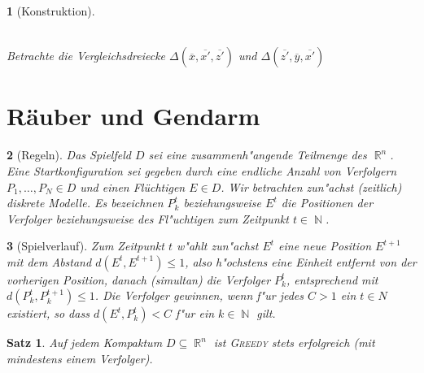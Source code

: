 \documentclass[paper=A4, twoside, chapterprefix=true, bibliography=totoc, headsepline]{scrbook}
\DeclareMathOperator{\N}{\mathbb{N}}
\DeclareMathOperator{\R}{\mathbb{R}}
\newcommand{\kapit}[1]{\textsc{#1}\xspace} %
\newcommand{\Greedy}{\kapit{Greedy}}
\theoremstyle{break}
\theoremstyle{nonumberbreak}
\newtheorem{satz}{Satz}
\theoremstyle{emptybreak}
\newtheorem{emptythm}{}%
\theoremstyle{break}
\newcommand{\quot}[1]{\textrm{\glqq}{#1}\textrm{\grqq}}
\begin{document}
\begin{emptythm}[Konstruktion]
\begin{center}
\\
Betrachte die Vergleichsdreiecke $\Delta(\overline x, \overline{x'}, \overline{z'})$ und $\Delta(\overline{z'}, \overline{y}, \overline{x'})$
\end{center}
\end{emptythm}

\section{R\"auber und Gendarm}

\begin{emptythm}[Regeln]
Das Spielfeld $D$ sei eine zusammenh"angende Teilmenge des $\R^n$.
Eine Startkonfiguration sei gegeben durch eine endliche Anzahl von Verfolgern $P_1, \ldots, P_N \in D$ und einen Flüchtigen $E \in D$.
Wir betrachten zun"achst (zeitlich) diskrete Modelle.
Es bezeichnen $P_k^t$ beziehungsweise $E^t$ die Positionen der Verfolger beziehungsweise des Fl"uchtigen zum Zeitpunkt $t \in \N$.
\end{emptythm}

\begin{emptythm}[Spielverlauf]
Zum Zeitpunkt $t$ w"ahlt zun"achst $E^t$ eine neue Position $E^{t+1}$ mit dem Abstand $d(E^t, E^{t+1}) \le 1$, also h"ochstens eine Einheit entfernt von der vorherigen Position, danach (simultan) die Verfolger $P_k^t$, entsprechend mit $d(P_k^t, P_k^{t+1}) \le 1$.
Die Verfolger gewinnen, wenn f"ur jedes $C > 1$ ein $t \in N$ existiert, so dass $d(E^t, P_k^t) < C$ f"ur ein $k \in \N$ gilt.
\end{emptythm}

\begin{satz}
Auf jedem Kompaktum $D \subseteq \R^n$ ist \quot{\index{Greedy@\Greedy}\Greedy} stets erfolgreich (mit mindestens einem Verfolger).
\end{satz}
\end{document}
